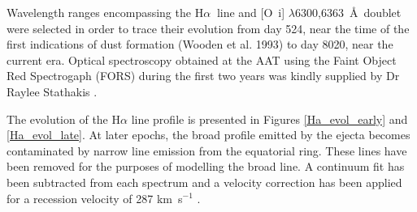 \documentclass[useAMS,usenatbib,usegraphicx]{mnras}
\begin{document}
Wavelength ranges encompassing the H$\alpha\ $ line and [O~{\sc i}] 
$\lambda$6300,6363~\AA\ doublet were selected in order to trace their 
evolution from day 524, near the time of the first indications of dust 
formation (Wooden et al. 1993) to day 8020, near the current era. Optical 
spectroscopy obtained at the AAT using the Faint Object Red Spectrogaph 
(FORS) during the first two years was kindly supplied by Dr Raylee 
Stathakis \citep{Spyromilio1991, Spyromilio1993a, Hanuschik1993}.

The evolution of the H$\alpha$ line profile is presented in Figures 
\ref{Ha_evol_early} and \ref{Ha_evol_late}.  At later epochs, the broad 
profile emitted by the ejecta becomes contaminated by narrow line emission 
from the equatorial ring.  These lines have been removed for the purposes 
of modelling the broad line. A continuum fit has been subtracted from each 
spectrum and a velocity correction has been applied for a recession 
velocity of 287 km~s$^{-1}$ \citep{Groningsson2008}.
\end{document}
